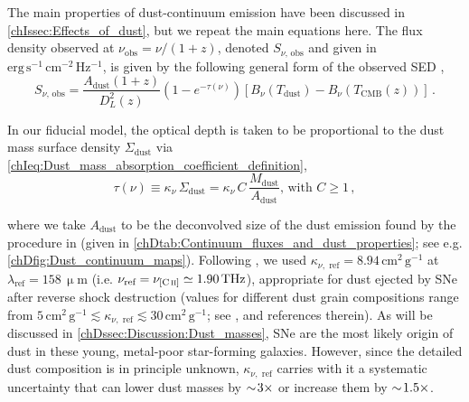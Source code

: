 The main properties of dust-continuum emission have been discussed in \cref{chIssec:Effects_of_dust}, but we repeat the main equations here. The flux density observed at $\nu_\text{obs} = \nu / (1+z)$, denoted $S_{\nu, \, \text{obs}}$ and given in $\mathrm{erg \, s^{-1} \, cm^{-2} \, Hz^{-1}}$, is given by the following general form of the observed SED \citep[\cref{chIeq:General_dust_SED_flux_density}, but see also][]{2020MNRAS.498.4109J},
\begin{equation}
    \label{chDeq:General_dust_SED_flux_density}
    S_{\nu, \, \text{obs}} = \frac{A_\text{dust} \left( 1+z \right)}{D_L^2 (z)} \left( 1 - e^{-\tau (\nu)} \right) \left[ B_\nu \left(T_\text{dust} \right) - B_\nu \left(T_\text{CMB} (z) \right) \right] \, .
\end{equation}

In our fiducial model, the optical depth is taken to be proportional to the dust mass surface density $\Sigma_\text{dust}$ via \cref{chIeq:Dust_mass_absorption_coefficient_definition},
\begin{equation}
    \label{chDeq:Dust_mass_absorption_coefficient_definition}
    \tau (\nu) \equiv \kappa_\nu \, \Sigma_\text{dust} = \kappa_\nu \, C \, \frac{M_\text{dust}}{A_\text{dust}} \text{, with } C \geq 1 \, ,
\end{equation}

\noindent where we take $A_\text{dust}$ to be the deconvolved size of the dust emission found by the  procedure in  (given in \cref{chDtab:Continuum_fluxes_and_dust_properties}; see e.g. \cref{chDfig:Dust_continuum_maps}). Following \citet{2022ApJ...928...31S}, we used $\kappa_{\nu, \text{ ref}} = 8.94 \, \mathrm{cm^2 \, g^{-1}}$ at $\lambda_\text{ref} = 158 \, \mathrm{\upmu m}$ (i.e. $\nu_\text{ref} = \nu_\CII \simeq 1.90 \, \mathrm{THz}$), appropriate for dust ejected by SNe after reverse shock destruction (values for different dust grain compositions range from $5 \, \mathrm{cm^2 \, g^{-1}} \lesssim \kappa_{\nu, \text{ ref}} \lesssim 30 \, \mathrm{cm^2 \, g^{-1}}$; see \citealt{2014MNRAS.443.1704H}, and references therein). As will be discussed in \cref{chDssec:Discussion:Dust_masses}, SNe are the most likely origin of dust in these young, metal-poor star-forming galaxies. However, since the detailed dust composition is in principle unknown, $\kappa_{\nu, \text{ ref}}$ carries with it a systematic uncertainty that can lower dust masses by $\sim \! 3 \times$ or increase them by $\sim \! 1.5 \times$.

